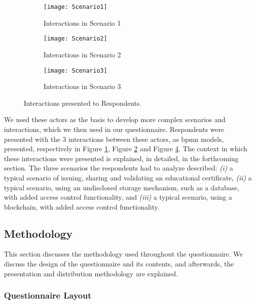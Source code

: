 \begin{figure}[htb]
	\centering
	\begin{subfigure}[b]{0.3\textwidth}
		\centering
		\texttt{[image: Scenario1]}
		\caption{Interactions in Scenario 1}
		\label{fig: Scenario1}
	\end{subfigure}
	\begin{subfigure}[b]{0.3\textwidth}
		\centering
		\texttt{[image: Scenario2]}
		\caption{Interactions in Scenario 2}
		\label{fig: Scenario2}
	\end{subfigure}
	\begin{subfigure}[b]{0.3\textwidth}
		\centering
		\texttt{[image: Scenario3]}
		\caption{Interactions in Scenario 3}
		\label{fig: Scenario3}
	\end{subfigure}

	\caption{Interactions presented to Respondents.}
\end{figure}

We used these actors as the basis to develop more complex scenarios and interactions, which we then used in our questionnaire. Respondents were presented with the 3 interactions between these actors, as \gls{bpmn} models, presented, respectively in Figure \ref{fig: Scenario1}, Figure \ref{fig: Scenario2} and Figure \ref{fig: Scenario3}. The context in which these interactions were presented is explained, in detailed, in the forthcoming section. The three scenarios the respondents had to analyze described:
\emph{(i)} a typical scenario of issuing, sharing and validating an educational certificate, \emph{(ii)} a typical scenario, using an undisclosed storage mechanism, such as a database, with added access control functionality, and \emph{(iii)} a typical scenario, using a blockchain, with added access control functionality.

\subsection{Methodology}

This section discusses the methodology used throughout the questionnaire. We discuss the design of the questionnaire and its contents, and afterwards, the presentation and distribution methodology are explained.

\subsubsection{Questionnaire Layout}


